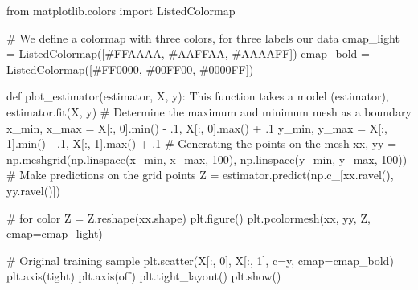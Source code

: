 \documentclass[
  letterpaper,
  DIV=11,
  numbers=noendperiod]{scrartcl}
\newenvironment{Shaded}{\begin{snugshade}}{\end{snugshade}}
\newcommand{\BuiltInTok}[1]{\textcolor[rgb]{0.00,0.23,0.31}{#1}}
\newcommand{\CommentTok}[1]{\textcolor[rgb]{0.37,0.37,0.37}{#1}}
\newcommand{\DecValTok}[1]{\textcolor[rgb]{0.68,0.00,0.00}{#1}}
\newcommand{\FloatTok}[1]{\textcolor[rgb]{0.68,0.00,0.00}{#1}}
\newcommand{\ImportTok}[1]{\textcolor[rgb]{0.00,0.46,0.62}{#1}}
\newcommand{\KeywordTok}[1]{\textcolor[rgb]{0.00,0.23,0.31}{#1}}
\newcommand{\NormalTok}[1]{\textcolor[rgb]{0.00,0.23,0.31}{#1}}
\newcommand{\OperatorTok}[1]{\textcolor[rgb]{0.37,0.37,0.37}{#1}}
\newcommand{\StringTok}[1]{\textcolor[rgb]{0.13,0.47,0.30}{#1}}
\begin{document}
\begin{Shaded}
\begin{Highlighting}[]
\ImportTok{from}\NormalTok{ matplotlib.colors }\ImportTok{import}\NormalTok{ ListedColormap}

\CommentTok{\# We define a colormap with three colors, for three labels our data}
\NormalTok{cmap\_light }\OperatorTok{=}\NormalTok{ ListedColormap([}\StringTok{\textquotesingle{}\#FFAAAA\textquotesingle{}}\NormalTok{, }\StringTok{\textquotesingle{}\#AAFFAA\textquotesingle{}}\NormalTok{, }\StringTok{\textquotesingle{}\#AAAAFF\textquotesingle{}}\NormalTok{])}
\NormalTok{cmap\_bold }\OperatorTok{=}\NormalTok{ ListedColormap([}\StringTok{\textquotesingle{}\#FF0000\textquotesingle{}}\NormalTok{, }\StringTok{\textquotesingle{}\#00FF00\textquotesingle{}}\NormalTok{, }\StringTok{\textquotesingle{}\#0000FF\textquotesingle{}}\NormalTok{])}

\KeywordTok{def}\NormalTok{ plot\_estimator(estimator, X, y):}
    \CommentTok{\textquotesingle{}\textquotesingle{}\textquotesingle{}}
\CommentTok{    This function takes a model (estimator), }
\CommentTok{    \textquotesingle{}\textquotesingle{}\textquotesingle{}}
\NormalTok{    estimator.fit(X, y)}
    \CommentTok{\# Determine the maximum and minimum mesh as a boundary}
\NormalTok{    x\_min, x\_max }\OperatorTok{=}\NormalTok{ X[:, }\DecValTok{0}\NormalTok{].}\BuiltInTok{min}\NormalTok{() }\OperatorTok{{-}} \FloatTok{.1}\NormalTok{, X[:, }\DecValTok{0}\NormalTok{].}\BuiltInTok{max}\NormalTok{() }\OperatorTok{+} \FloatTok{.1}
\NormalTok{    y\_min, y\_max }\OperatorTok{=}\NormalTok{ X[:, }\DecValTok{1}\NormalTok{].}\BuiltInTok{min}\NormalTok{() }\OperatorTok{{-}} \FloatTok{.1}\NormalTok{, X[:, }\DecValTok{1}\NormalTok{].}\BuiltInTok{max}\NormalTok{() }\OperatorTok{+} \FloatTok{.1}
    \CommentTok{\# Generating the points on the mesh}
\NormalTok{    xx, yy }\OperatorTok{=}\NormalTok{ np.meshgrid(np.linspace(x\_min, x\_max, }\DecValTok{100}\NormalTok{),}
\NormalTok{                         np.linspace(y\_min, y\_max, }\DecValTok{100}\NormalTok{))}
    \CommentTok{\# Make predictions on the grid points}
\NormalTok{    Z }\OperatorTok{=}\NormalTok{ estimator.predict(np.c\_[xx.ravel(), yy.ravel()])}

    \CommentTok{\# for color}
\NormalTok{    Z }\OperatorTok{=}\NormalTok{ Z.reshape(xx.shape)}
\NormalTok{    plt.figure()}
\NormalTok{    plt.pcolormesh(xx, yy, Z, cmap}\OperatorTok{=}\NormalTok{cmap\_light)}

    \CommentTok{\# Original training sample}
\NormalTok{    plt.scatter(X[:, }\DecValTok{0}\NormalTok{], X[:, }\DecValTok{1}\NormalTok{], c}\OperatorTok{=}\NormalTok{y, cmap}\OperatorTok{=}\NormalTok{cmap\_bold)}
\NormalTok{    plt.axis(}\StringTok{\textquotesingle{}tight\textquotesingle{}}\NormalTok{)}
\NormalTok{    plt.axis(}\StringTok{\textquotesingle{}off\textquotesingle{}}\NormalTok{)}
\NormalTok{    plt.tight\_layout()}
\NormalTok{    plt.show()}
\end{Highlighting}
\end{Shaded}
\end{document}
